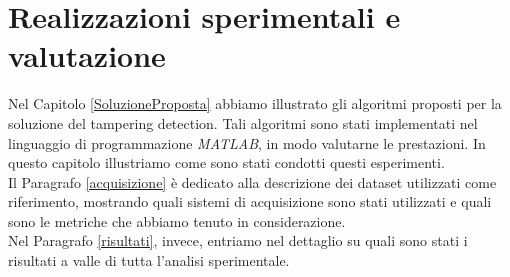 \chapter{Realizzazioni sperimentali e valutazione}
\label{ProveSperimentali}
\thispagestyle{empty}

\vspace{0.5cm}

\noindent Nel Capitolo \ref{SoluzioneProposta} abbiamo illustrato gli algoritmi proposti per la soluzione del tampering detection.
Tali algoritmi sono stati implementati nel linguaggio di programmazione \textit{MATLAB}, in modo valutarne le prestazioni. 
In questo capitolo illustriamo come sono stati condotti questi esperimenti.\\
Il Paragrafo \ref{acquisizione} \`e dedicato alla descrizione dei dataset utilizzati come riferimento, mostrando quali sistemi di acquisizione sono stati utilizzati e quali sono le metriche che abbiamo tenuto in considerazione.\\
Nel Paragrafo \ref{risultati}, invece, entriamo nel dettaglio su quali sono stati i risultati a valle di tutta l'analisi sperimentale. 
